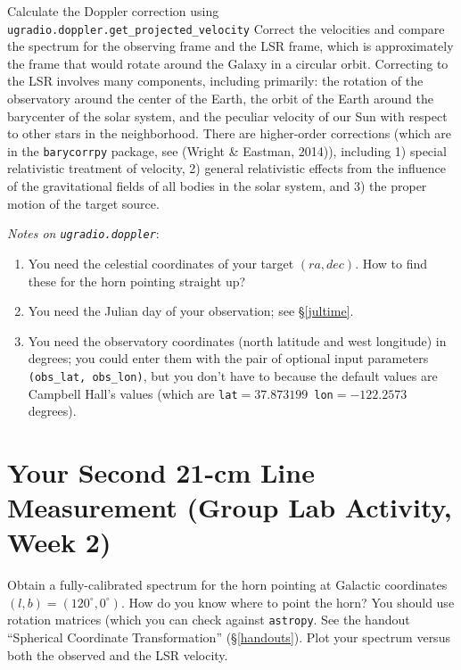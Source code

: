 \documentclass[11pt,preprint]{aastex}
\begin{document}
Calculate the Doppler correction using {\tt ugradio.doppler.get\_projected\_velocity} 
Correct the velocities and compare the spectrum for the observing frame
and the LSR frame, which is approximately the frame that would rotate
around the Galaxy in a circular orbit.  Correcting to the LSR involves many components,
including primarily: the rotation of the observatory around the center of the Earth, the
orbit of the Earth around the barycenter of the solar system, and the peculiar velocity
of our Sun with respect to other stars in the neighborhood.  There are higher-order
corrections (which are in the {\tt barycorrpy} package, 
see (Wright \& Eastman, 2014)), including 1) special relativistic treatment of velocity,
2) general relativistic effects from the influence of the gravitational fields of all bodies
in the solar system, and 3) the proper motion of the target source.

{\it Notes on \verb$ugradio.doppler$}: \begin{enumerate}

\item You need the celestial coordinates of your target $(ra, dec)$. How
  to find these for the horn pointing straight up?

\item You need the Julian day of your observation; see \S \ref{jultime}.

\item You need the observatory coordinates (north latitude and west
  longitude) in degrees; you could enter them with the pair of optional
  input parameters {\tt (obs\_lat, obs\_lon)}, but you don't have to because
  the default values are Campbell Hall's values (which are {\tt lat$=37.873199$
  lon$=-122.2573$} degrees).

\end{enumerate}

\section{Your Second 21-cm Line Measurement (Group Lab Activity, Week 2)}
\label{meas2}

\noindent
Obtain a fully-calibrated spectrum for the horn pointing at Galactic
coordinates $(l,b)=(120^\circ, 0^\circ)$. How do you know where to point
the horn? You should use rotation matrices (which you can check against {\tt astropy}.  See the
handout ``Spherical Coordinate Transformation''
(\S \ref{handouts}). Plot your spectrum versus both the observed and
the LSR velocity. 
\end{document}
